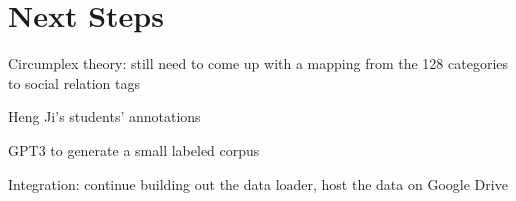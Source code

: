 \documentclass[12pt]{article}
\begin{document}
\section{Next Steps}
Circumplex theory: still need to come up with a mapping from the 128 categories to social relation tags

Heng Ji's students' annotations

GPT3 to generate a small labeled corpus

Integration: continue building out the data loader, host the data on Google Drive

\printbibliography
\end{document}
